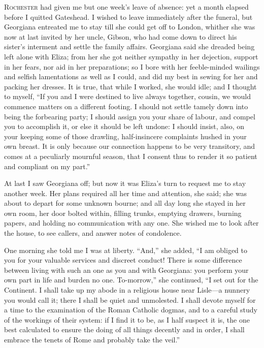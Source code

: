 
 \textsc{ Rochester} had given me but one week's leave of absence: yet a month
elapsed before I quitted Gateshead. I wished to leave immediately after
the funeral, but Georgiana entreated me to stay till she could get off
to London, whither she was now at last invited by her uncle, \Mr{} Gibson,
who had come down to direct his sister's interment and settle the family
affairs. Georgiana said she dreaded being left alone with Eliza; from
her she got neither sympathy in her dejection, support in her fears, nor
aid in her preparations; so I bore with her feeble-minded wailings and
selfish lamentations as well as I could, and did my best in sewing for
her and packing her dresses. It is true, that while I worked, she would
idle; and I thought to myself, \enquote{If you and I were destined to
	live always together, cousin, we would commence matters on a different
	footing. I should not settle tamely down into being the forbearing
	party; I should assign you your share of labour, and compel you to
	accomplish it, or else it should be left undone: I should insist, also,
	on your keeping some of those drawling, half-insincere complaints hushed
	in your own breast. It is only because our connection happens to be
	very transitory, and comes at a peculiarly mournful season, that I
	consent thus to render it so patient and compliant on my part.}

At last I saw Georgiana off; but now it was Eliza's turn to request me
to stay another week. Her plans required all her time and attention,
she said; she was about to depart for some unknown bourne; and all day
long she stayed in her own room, her door bolted within, filling trunks,
emptying drawers, burning papers, and holding no communication with any
one. She wished me to look after the house, to see callers, and answer
notes of condolence.

One morning she told me I was at liberty. \enquote{And,} she added,
\enquote{I am obliged to you for your valuable services and discreet
	conduct! There is some difference between living with such an one as
	you and with Georgiana: you perform your own part in life and burden no
	one. To-morrow,} she continued, \enquote{I set out for the Continent.
	I shall take up my abode in a religious house near Lisle---a nunnery you
	would call it; there I shall be quiet and unmolested. I shall devote
	myself for a time to the examination of the Roman Catholic dogmas, and
	to a careful study of the workings of their system: if I find it to be,
	as I half suspect it is, the one best calculated to ensure the doing of
	all things decently and in order, I shall embrace the tenets of Rome and
	probably take the veil.}

